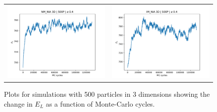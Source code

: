 \begin{figure}
\hspace{-2.8cm}
\begin{tabular}{cc}
\includegraphics[width = 0.5\paperwidth]{figures/c_figs/NM_NIA_3D_500P_mc.pdf} & \includegraphics[width = 0.5\paperwidth]{figures/c_figs/IM_NIA_3D_500P_mc.pdf} \\
\end{tabular}
\caption{Plots for simulations with 500 particles in 3 dimensions showing the change in $E_L$ as a function of Monte-Carlo cycles.}
\label{fig:1c_mc}
\end{figure}
